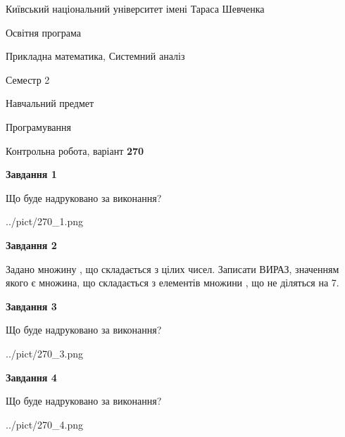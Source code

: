 \documentclass[12pt, ukrainian]{article}
\begin{document}
{{\begin {small}\par
{ \center  Київський національний університет імені Тараса Шевченка \par}
{\parbox {5 cm}{Освітня програма \hfill}{\parbox {8 cm}{Прикладна математика, Системний аналіз \hfill}}\parbox {5 cm}{\hfill Семестр 2}}\par
{\parbox {5 cm} {Навчальний предмет \hfill}\parbox {7 cm}{Програмування \hfill}\parbox {6cm}{\hfill}\par}\vspace{-7pt} \end{small}}{\center Контрольна робота, варіант  \No \textbf
{ 270 }\par}}
{
\begin {large}
{\begin {center}\textbf{Завдання 1}\end {center}}\par
Що буде надруковано за виконання?\par\par
\begin{center}
	{../pict/270_1.png}
\end{center}
\newpage

{\begin {center}\textbf{Завдання 2}\end {center}}\par
Задано множину , що складається з цілих чисел. Записати ВИРАЗ, значенням якого є множина, що складається  з елементів множини , що не діляться на 7.\par
\newpage

{\begin {center}\textbf{Завдання 3}\end {center}}\par
Що буде надруковано за виконання?\par
\begin{center}
	{../pict/270_3.png}
\end{center}
\newpage

{\begin {center}\textbf{Завдання 4}\end {center}}\par
Що буде надруковано за виконання?\par
\begin{center}
	{../pict/270_4.png}
\end{center}
\newpage


\end{large}}
\end{document}
